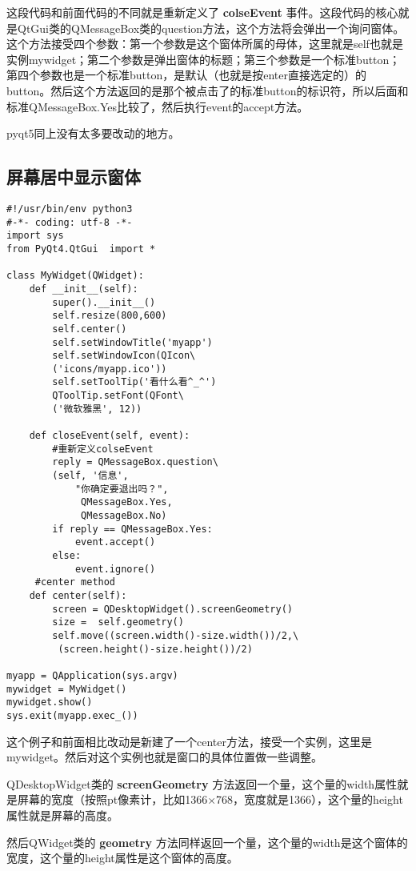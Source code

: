 \documentclass[11pt,oneside]{article}
\begin{document}
这段代码和前面代码的不同就是重新定义了 \textbf{colseEvent} 事件。这段代码的核心就是QtGui类的QMessageBox类的question方法，这个方法将会弹出一个询问窗体。这个方法接受四个参数：第一个参数是这个窗体所属的母体，这里就是self也就是实例mywidget；第二个参数是弹出窗体的标题；第三个参数是一个标准button；第四个参数也是一个标准button，是默认（也就是按enter直接选定的）的button。然后这个方法返回的是那个被点击了的标准button的标识符，所以后面和标准QMessageBox.Yes比较了，然后执行event的accept方法。


pyqt5同上没有太多要改动的地方。


\subsection{屏幕居中显示窗体}
\label{sec:orgheadline9}
\begin{verbatim}
#!/usr/bin/env python3
#-*- coding: utf-8 -*-
import sys
from PyQt4.QtGui  import *

class MyWidget(QWidget):
    def __init__(self):
        super().__init__()
        self.resize(800,600)
        self.center()
        self.setWindowTitle('myapp')
        self.setWindowIcon(QIcon\
        ('icons/myapp.ico'))
        self.setToolTip('看什么看^_^')
        QToolTip.setFont(QFont\
        ('微软雅黑', 12))

    def closeEvent(self, event):
        #重新定义colseEvent
        reply = QMessageBox.question\
        (self, '信息',
            "你确定要退出吗？",
             QMessageBox.Yes,
             QMessageBox.No)
        if reply == QMessageBox.Yes:
            event.accept()
        else:
            event.ignore()
     #center method
    def center(self):
        screen = QDesktopWidget().screenGeometry()
        size =  self.geometry()
        self.move((screen.width()-size.width())/2,\
         (screen.height()-size.height())/2)

myapp = QApplication(sys.argv)
mywidget = MyWidget()
mywidget.show()
sys.exit(myapp.exec_())
\end{verbatim}

这个例子和前面相比改动是新建了一个center方法，接受一个实例，这里是mywidget。然后对这个实例也就是窗口的具体位置做一些调整。

QDesktopWidget类的 \textbf{screenGeometry} 方法返回一个量，这个量的width属性就是屏幕的宽度（按照pt像素计，比如1366×768，宽度就是1366），这个量的height属性就是屏幕的高度。

然后QWidget类的 \textbf{geometry} 方法同样返回一个量，这个量的width是这个窗体的宽度，这个量的height属性是这个窗体的高度。
\end{document}
